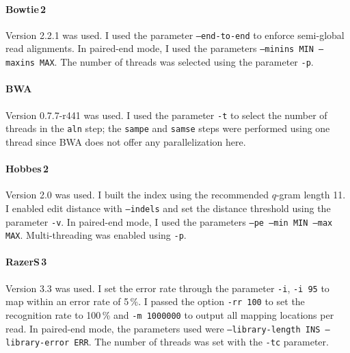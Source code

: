 \paragraph{Bowtie\,2}
Version 2.2.1 was used.
I used the parameter \texttt{--end-to-end} to enforce semi-global read alignments.
In paired-end mode, I used the parameters \texttt{--minins MIN --maxins MAX}.
The number of threads was selected using the parameter \texttt{-p}.

\paragraph{BWA}
Version 0.7.7-r441 was used.
I used the parameter \texttt{-t} to select the number of threads in the \texttt{aln} step;
the \texttt{sampe} and \texttt{samse} steps were performed using one thread since BWA does not offer any parallelization here.

\paragraph{Hobbes\,2}
Version 2.0 was used.
I built the index using the recommended $q$-gram length 11.
I enabled edit distance with \texttt{--indels} and set the distance threshold using the parameter \texttt{-v}.
In paired-end mode, I used the parameters \texttt{--pe --min MIN --max MAX}.
Multi-threading was enabled using \texttt{-p}.

\paragraph{RazerS\,3}
Version 3.3 was used.
I set the error rate through the parameter \texttt{-i}, \eg \texttt{-i 95} to map within an error rate of 5\,\%.
I passed the option \texttt{-rr 100} to set the recognition rate to 100\,\% and \texttt{-m 1000000} to output all mapping locations per read.
In paired-end mode, the parameters used were \texttt{--library-length INS --library-error ERR}.
The number of threads was set with the \texttt{-tc} parameter.
